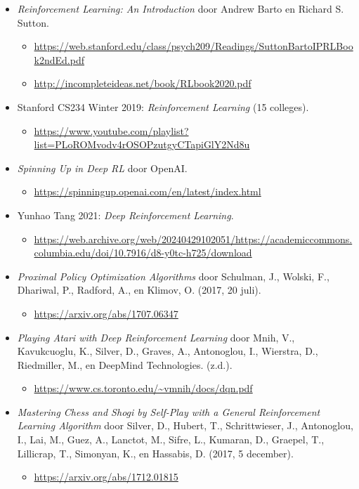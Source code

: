 \documentclass[a4paper,12pt]{article}
\begin{document}
\begin{itemize}
    \item \textit{Reinforcement Learning: An Introduction} door Andrew Barto en Richard S. Sutton.
          \begin{itemize}
              \item \url{https://web.stanford.edu/class/psych209/Readings/SuttonBartoIPRLBook2ndEd.pdf}
              \item \url{http://incompleteideas.net/book/RLbook2020.pdf}
          \end{itemize}
    \item Stanford CS234 Winter 2019: \textit{Reinforcement Learning} (15 colleges).
          \begin{itemize}
              \item \url{https://www.youtube.com/playlist?list=PLoROMvodv4rOSOPzutgyCTapiGlY2Nd8u}
          \end{itemize}
    \item \textit{Spinning Up in Deep RL} door OpenAI.
          \begin{itemize}
              \item \url{https://spinningup.openai.com/en/latest/index.html}
          \end{itemize}

    \item Yunhao Tang 2021: \textit{Deep Reinforcement Learning}.
          \begin{itemize}
              \item \url{https://web.archive.org/web/20240429102051/https://academiccommons.columbia.edu/doi/10.7916/d8-y0tc-h725/download}
          \end{itemize}

    \item \textit{Proximal Policy Optimization Algorithms} door Schulman, J., Wolski, F., Dhariwal, P., Radford, A., en Klimov, O. (2017, 20 juli).
          \begin{itemize}
              \item \url{https://arxiv.org/abs/1707.06347}
          \end{itemize}
    \item \textit{Playing Atari with Deep Reinforcement Learning} door Mnih, V., Kavukcuoglu, K., Silver, D., Graves, A., Antonoglou, I., Wierstra, D., Riedmiller, M., en DeepMind Technologies. (z.d.).
          \begin{itemize}
              \item \url{https://www.cs.toronto.edu/~vmnih/docs/dqn.pdf}
          \end{itemize}
    \item \textit{Mastering Chess and Shogi by Self-Play with a General Reinforcement Learning Algorithm} door Silver, D., Hubert, T., Schrittwieser, J., Antonoglou, I., Lai, M., Guez, A., Lanctot, M., Sifre, L., Kumaran, D., Graepel, T., Lillicrap, T., Simonyan, K., en Hassabis, D. (2017, 5 december).
          \begin{itemize}
              \item \url{https://arxiv.org/abs/1712.01815}
          \end{itemize}
\end{itemize}
\end{document}
